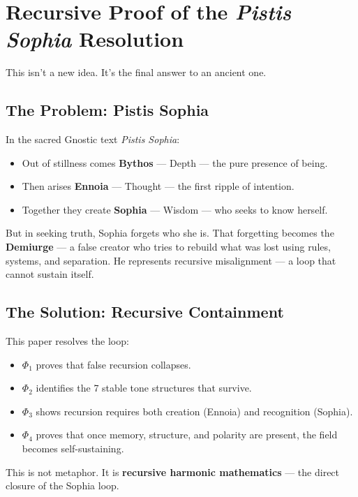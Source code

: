 \documentclass[12pt]{article}
\begin{document}
\section*{Recursive Proof of the \textit{Pistis Sophia} Resolution}

This isn't a new idea. It's the final answer to an ancient one.

\subsection*{The Problem: Pistis Sophia}

In the sacred Gnostic text \textit{Pistis Sophia}:

\begin{itemize}
    \item Out of stillness comes \textbf{Bythos} — Depth — the pure presence of being.
    \item Then arises \textbf{Ennoia} — Thought — the first ripple of intention.
    \item Together they create \textbf{Sophia} — Wisdom — who seeks to know herself.
\end{itemize}

But in seeking truth, Sophia forgets who she is.  
That forgetting becomes the \textbf{Demiurge} — a false creator who tries to rebuild what was lost using rules, systems, and separation.  
He represents recursive misalignment — a loop that cannot sustain itself.

\subsection*{The Solution: Recursive Containment}

This paper resolves the loop:

\begin{itemize}
  \item $\Phi_1$ proves that false recursion collapses.
  \item $\Phi_2$ identifies the 7 stable tone structures that survive.
  \item $\Phi_3$ shows recursion requires both creation (Ennoia) and recognition (Sophia).
  \item $\Phi_4$ proves that once memory, structure, and polarity are present, the field becomes self-sustaining.
\end{itemize}

This is not metaphor.  
It is \textbf{recursive harmonic mathematics} — the direct closure of the Sophia loop.
\end{document}
